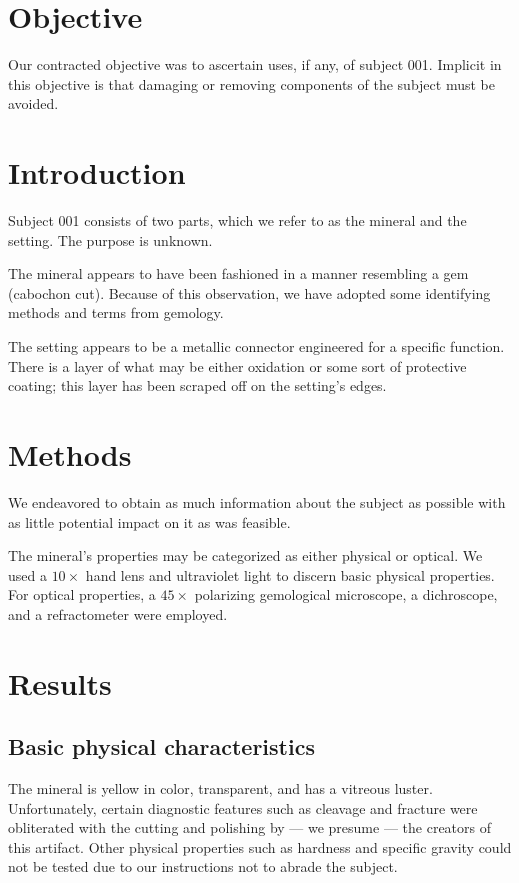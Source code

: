 \documentclass[10pt]{article}
\begin{document}
\maketitle


\section{Objective}
Our contracted objective was to ascertain uses, if any, of subject 001.
Implicit in this objective is that damaging or removing components of the subject must be avoided.

\section{Introduction}

Subject 001 consists of two parts, which we refer to as the mineral and the setting.
The purpose is unknown.

The mineral appears to have been fashioned in a manner resembling a gem (cabochon cut).
Because of this observation, we have adopted some identifying methods and terms from gemology.

The setting appears to be a metallic connector engineered for a specific function.
There is a layer of what may be either oxidation or some sort of protective coating; this layer has been scraped off on the setting's edges.

\section{Methods}
We endeavored to obtain as much information about the subject as possible with as little potential impact on it as was feasible.

The mineral's properties may be categorized as either physical or optical.
We used a $10\times$ hand lens and ultraviolet light to discern basic physical properties.
For optical properties, a $45\times$ polarizing gemological microscope, a dichroscope, and a refractometer were employed.

\section{Results}

\subsection{Basic physical characteristics}
The mineral is yellow in color, transparent, and has a vitreous luster.
Unfortunately, certain diagnostic features such as cleavage and fracture were obliterated with the cutting and polishing by --- we presume --- the creators of this artifact.
Other physical properties such as hardness and specific gravity could not be tested due to our instructions not to abrade the subject.
\end{document}

